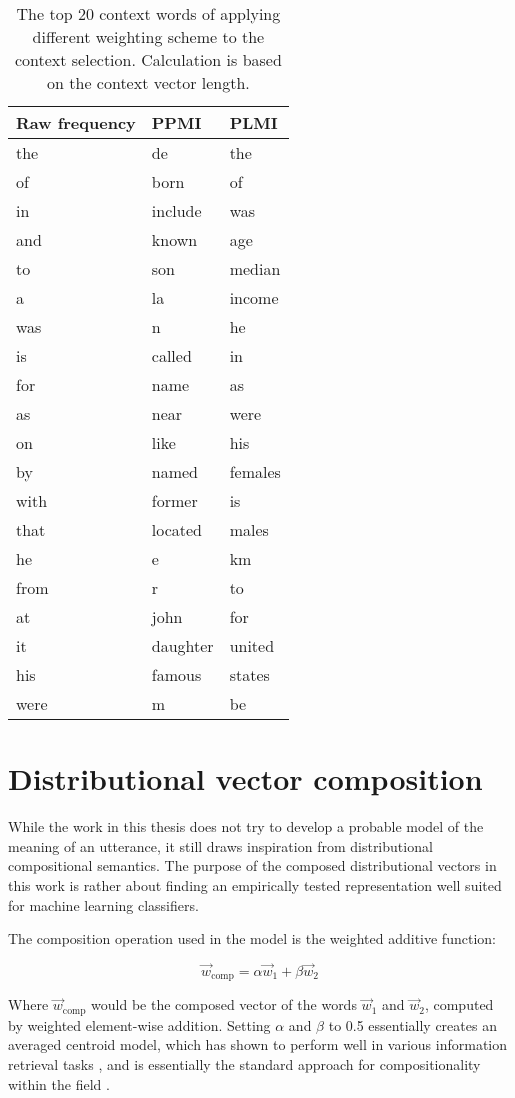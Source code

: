 \begin{table}[H]
\centering
\begin{tabular}{lll}
\hline
Raw frequency & PPMI     & PLMI \\
\hline
the  & de       & the \\[-4pt]
of   & born     & of \\[-4pt]
in   & include  & was \\[-4pt]
and  & known    & age \\[-4pt]
to   & son      & median \\[-4pt]
a    & la       & income \\[-4pt]
was  & n        & he \\[-4pt]
is   & called   & in \\[-4pt]
for  & name     & as \\[-4pt]
as   & near     & were \\[-4pt]
on   & like     & his \\[-4pt]
by   & named    & females \\[-4pt]
with & former   & is \\[-4pt]
that & located  & males \\[-4pt]
he   & e        & km \\[-4pt]
from & r        & to \\[-4pt]
at   & john     & for \\[-4pt]
it   & daughter & united \\[-4pt]
his  & famous   & states \\[-4pt]
were & m        & be \\[-4pt]
\hline
    \end{tabular}
    \caption{The top 20 context words of applying different weighting scheme to the context selection. Calculation is based on the context vector length. }
    \label{tbl:featureselection-weights}
\end{table}
\section{Distributional vector composition}

While the work in this thesis does not try to develop a probable model of the meaning of an utterance, it still draws inspiration from distributional compositional semantics. The purpose of the composed distributional vectors in this work is rather about finding an empirically tested representation well suited for machine learning classifiers.

The composition operation used in the model is the weighted additive function:

\begin{equation}\vec{w}_{\text{comp}} = \alpha \vec{w}_1 + \beta \vec{w}_2\end{equation}

Where $\vec{w}_{\text{comp}}$ would be the composed vector of the words $\vec{w}_1$ and $\vec{w}_2$, computed by weighted element-wise addition. Setting $\alpha$ and $\beta$ to 0.5 essentially creates an averaged centroid model, which has shown to perform well in various information retrieval tasks \parencite{Mitchell2010Composition}, and is essentially the standard approach for compositionality within the field \parencite{Guevara2011Computing}.
